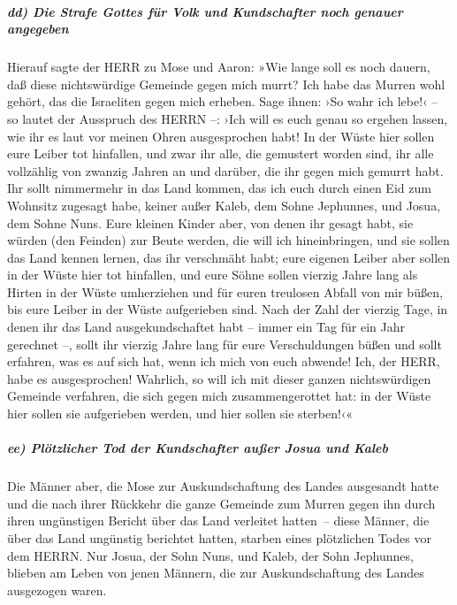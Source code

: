 \hypertarget{dd-die-strafe-gottes-fuxfcr-volk-und-kundschafter-noch-genauer-angegeben}{%
\subparagraph{dd) Die Strafe Gottes für Volk und Kundschafter noch
genauer
angegeben}\label{dd-die-strafe-gottes-fuxfcr-volk-und-kundschafter-noch-genauer-angegeben}}

Hierauf sagte der HERR zu Mose und Aaron:
»Wie lange soll es noch dauern, daß diese nichtswürdige
Gemeinde gegen mich murrt? Ich habe das Murren wohl gehört, das die
Israeliten gegen mich erheben. Sage ihnen: ›So wahr ich
lebe!‹ -- so lautet der Ausspruch des HERRN --: ›Ich will es euch genau
so ergehen lassen, wie ihr es laut vor meinen Ohren ausgesprochen habt!
In der Wüste hier sollen eure Leiber tot hinfallen, und
zwar ihr alle, die gemustert worden sind, ihr alle vollzählig von
zwanzig Jahren an und darüber, die ihr gegen mich gemurrt habt.
Ihr sollt nimmermehr in das Land kommen, das ich euch
durch einen Eid zum Wohnsitz zugesagt habe, keiner außer Kaleb, dem
Sohne Jephunnes, und Josua, dem Sohne Nuns. Eure kleinen
Kinder aber, von denen ihr gesagt habt, sie würden (den Feinden) zur
Beute werden, die will ich hineinbringen, und sie sollen das Land kennen
lernen, das ihr verschmäht habt; eure eigenen Leiber aber
sollen in der Wüste hier tot hinfallen, und eure Söhne
sollen vierzig Jahre lang als Hirten in der Wüste umherziehen und für
euren treulosen Abfall von mir büßen, bis eure Leiber in der Wüste
aufgerieben sind. Nach der Zahl der vierzig Tage, in
denen ihr das Land ausgekundschaftet habt -- immer ein Tag für ein Jahr
gerechnet --, sollt ihr vierzig Jahre lang für eure Verschuldungen büßen
und sollt erfahren, was es auf sich hat, wenn ich mich von euch abwende!
Ich, der HERR, habe es ausgesprochen! Wahrlich, so will
ich mit dieser ganzen nichtswürdigen Gemeinde verfahren, die sich gegen
mich zusammengerottet hat: in der Wüste hier sollen sie aufgerieben
werden, und hier sollen sie sterben!‹«

\hypertarget{ee-pluxf6tzlicher-tod-der-kundschafter-auuxdfer-josua-und-kaleb}{%
\subparagraph{ee) Plötzlicher Tod der Kundschafter außer Josua und
Kaleb}\label{ee-pluxf6tzlicher-tod-der-kundschafter-auuxdfer-josua-und-kaleb}}

Die Männer aber, die Mose zur Auskundschaftung des Landes
ausgesandt hatte und die nach ihrer Rückkehr die ganze Gemeinde zum
Murren gegen ihn durch ihren ungünstigen Bericht über das Land verleitet
hatten~-- diese Männer, die über das Land ungünstig
berichtet hatten, starben eines plötzlichen Todes vor dem HERRN.
Nur Josua, der Sohn Nuns, und Kaleb, der Sohn Jephunnes,
blieben am Leben von jenen Männern, die zur Auskundschaftung des Landes
ausgezogen waren.

